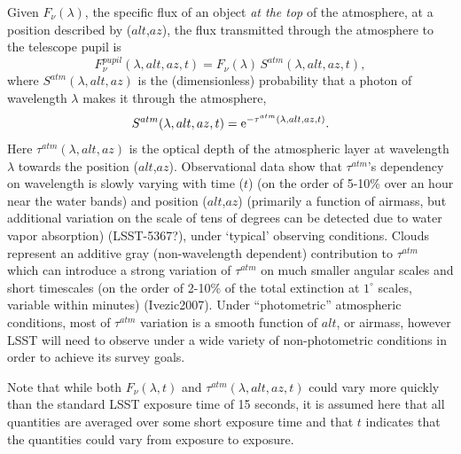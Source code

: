 \documentclass[12pt,preprint]{aastex}
\begin{document}
Given $F_\nu(\lambda)$, the specific flux of an object {\it at
the top} of the atmosphere, at a position described by ($alt$,$az$),
the flux transmitted through the atmosphere to the telescope pupil is
\begin{equation}
\label{eqn:Fpupil}
                      F_\nu^{pupil}(\lambda,alt,az,t) = F_\nu(\lambda) \, S^{atm}(\lambda,alt,az,t),
\end{equation}
where $S^{atm}(\lambda,alt,az)$ is the (dimensionless) probability that a photon of 
wavelength $\lambda$ makes it through the atmosphere,
\begin{equation}
\label{eqn:atmTau}
                        S^{atm}(\lambda,alt,az,t)   = {\rm e}^{-\tau^{atm}(\lambda,alt,az,t)}.
\end{equation}
Here $\tau^{atm}(\lambda,alt,az)$ is the optical depth of the
atmospheric layer at wavelength $\lambda$ towards the position
($alt$,$az$).  Observational data show that $\tau^{atm}$'s dependency
on wavelength is slowly varying with time ($t$) (on the order of
5-10\% over an hour near the water bands) and position ($alt$,$az$)
(primarily a function of airmass, but additional variation on the
scale of tens of degrees can be detected due to water vapor
absorption) (LSST-5367?), under `typical' observing conditions.  
Clouds represent an additive gray (non-wavelength dependent)
contribution to $\tau^{atm}$ which can introduce a strong variation of
$\tau^{atm}$ on much smaller angular scales and short timescales (on
the order of 2-10\% of the total extinction at $1^{\circ}$ scales,
variable within minutes) (Ivezic2007). Under ``photometric''
atmospheric conditions, most of $\tau^{atm}$ variation is a smooth
function of $alt$, or airmass, however LSST will need to observe under
a wide variety of non-photometric conditions in order to achieve its
survey goals.

Note that while both $F_\nu(\lambda,t)$ and $\tau^{atm}(\lambda,alt,az,t)$ 
could vary more quickly than the standard LSST exposure time of 15
seconds, it is assumed here that all quantities are averaged over some
short exposure time and that $t$ indicates that the quantities could
vary from exposure to exposure. 
\end{document}
